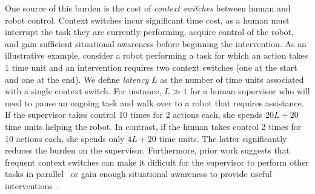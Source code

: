 One source of this burden is the cost of \textit{context switches} between human and robot control. 
Context switches incur significant time cost, as a human must interrupt the task they are currently performing, acquire control of the robot, and gain sufficient situational awareness before beginning the intervention. As an illustrative example, consider a robot performing a task for which an action takes 1 time unit and an intervention requires two context switches (one at the start and one at the end). We define \emph{latency} $L$ as the number of time units associated with a single context switch. For instance, $L \gg 1$ for a human supervisor who will need to pause an ongoing task and walk over to a robot that requires assistance. If the supervisor takes control 10 times for 2 actions each, she spends $20L + 20$ time units helping the robot. In contrast, if the human takes control 2 times for 10 actions each, she spends only $4L + 20$ time units. The latter significantly reduces the burden on the supervisor. Furthermore, prior work suggests that frequent context switches can make it difficult for the supervisor to perform other tasks in parallel~\cite{swamy2020scaled} or gain enough situational awareness to provide useful interventions~\cite{think_going}.

